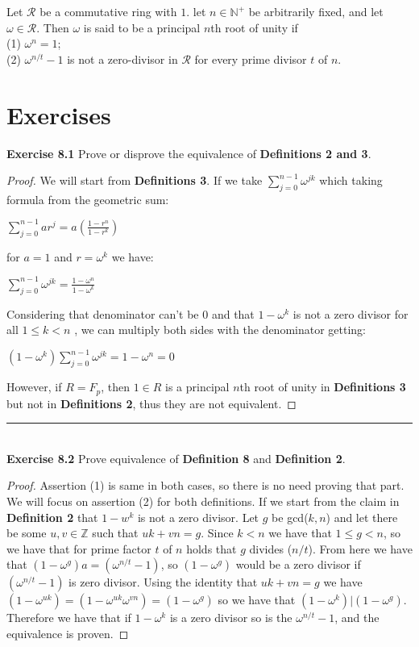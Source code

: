 \documentclass[a4paper]{article}
\begin{document}
\begin{definition}
Let $\mathcal{R}$ be a commutative ring with $1$. let $n \in \mathbb{N}^{+}$ be arbitrarily fixed, and let $\omega \in \mathcal{R}$. Then $\omega$ is said to be a principal $n$th root of unity if\\
(1) $\omega^{n} = 1$; \\
(2) $\omega^{n/t} - 1$ is not a zero-divisor in $\mathcal{R}$ for every prime divisor $t$ of $n$.
\end{definition}



\section{Exercises}
\noindent \textbf{Exercise 8.1}  Prove or disprove the equivalence of \textbf{Definitions 2 and 3}.
\begin{proof}
We will start from \textbf{Definitions 3}. If we take $\sum_{j=0}^{n-1}\omega^{jk}$ which taking formula from the geometric sum:
\begin{center}
$\sum_{j=0}^{n-1}ar^{j}=a\left( \frac{1- r^{n}}{1- r^{k}}\right)$
\end{center}
for $a = 1$ and $r = \omega^{k}$ we have:
\begin{center}
$\sum_{j=0}^{n-1}\omega^{jk}=\frac{1- \omega^{n}}{1- \omega^{k}}$
\end{center}
Considering that denominator can't be 0 and that ${1- \omega^{k}}$ is not a zero divisor for all $1 \leq k < n$ , we can multiply both sides with the denominator getting:
\begin{center}
$\left(1- \omega^{k}\right)\sum_{j=0}^{n-1}\omega^{jk}={1- \omega^{n}}=0$
\end{center}
However, if $R=F_{p}$, then $1 \in R$ is a principal $n$th root of unity in \textbf{Definitions 3} but not in \textbf{Definitions 2}, thus they are not equivalent.
\end{proof}



\noindent\rule{12cm}{0.4pt}\\
\noindent \textbf{Exercise 8.2} Prove equivalence of \textbf{Definition 8} and \textbf{Definition 2}.
\begin{proof}
Assertion (1) is same in both cases, so there is no need proving that part. We will focus on assertion (2) for both definitions. If we start from the claim in \textbf{Definition 2} that $1 - w^{k}$ is not a zero divisor. Let $g$ be gcd($k,n$) and let there be some $u,v \in \mathbb{Z}$ such that $uk + vn = g$. Since $k<n$ we have that $1 \leq g < n$, so we have that for prime factor $t$ of $n$ holds that $g$ divides ($n/t$). From here we have that $(1 - \omega^{g})a = (\omega^{n/t}-1)$, so $(1 - \omega^{g})$ would be a zero divisor if $(\omega^{n/t}-1)$ is zero divisor. Using the identity that $uk + vn = g$ we have $(1 - \omega^{uk})=(1 - \omega^{uk}\omega^{vn})=(1 - \omega^{g})$ so we have that $(1 - \omega^{k}) | (1 - \omega^{g})$. Therefore we have that if $1 - \omega^{k}$ is a zero divisor so is the $\omega^{n/t}-1$, and the equivalence is proven.
\end{proof}
\end{document}
